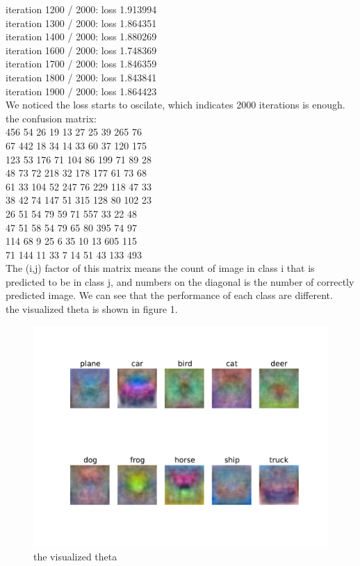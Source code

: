 \documentclass{article}
\begin{document}
iteration 1200 / 2000: loss 1.913994\\
iteration 1300 / 2000: loss 1.864351\\
iteration 1400 / 2000: loss 1.880269\\
iteration 1600 / 2000: loss 1.748369\\
iteration 1700 / 2000: loss 1.846359\\
iteration 1800 / 2000: loss 1.843841\\
iteration 1900 / 2000: loss 1.864423\\
We noticed the loss starts to oscilate, which indicates 2000 iterations is enough.\\[10pt] 
the confusion matrix:\\
456  54  26  19  13  27  25  39 265  76\\
 67 442  18  34  14  33  60  37 120 175\\
 123  53 176  71 104  86 199  71  89  28\\
  48  73  72 218  32 178 177  61  73  68\\
  61  33 104  52 247  76 229 118  47  33\\
  38  42  74 147  51 315 128  80 102  23\\
  26  51  54  79  59  71 557  33  22  48\\
  47  51  58  54  79  65  80 395  74  97\\
 114  68   9  25   6  35  10  13 605 115\\
  71 144  11  33   7  14  51  43 133 493\\
 The (i,j) factor of this matrix means the count of image in class i that is predicted to be in class j, and numbers on the diagonal is the number of correctly predicted image. We can see that the performance of each class are different. \\ 
the visualized theta is shown in figure 1.\\
\begin{figure}[H]
\centering
\includegraphics[width=1\linewidth]{./cifar_theta}
\caption{the visualized theta}
\label{fig:figure}
\end{figure}
\end{document}
